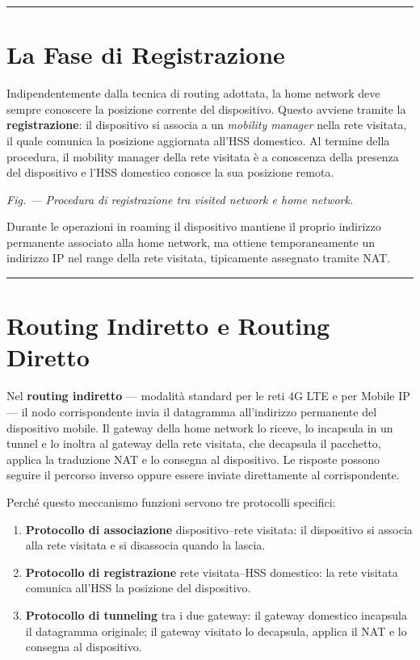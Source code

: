 \documentclass[
  italian,
  openany]{book}
\providecommand{\tightlist}{%
  \setlength{\itemsep}{0pt}\setlength{\parskip}{0pt}}
\begin{document}
\begin{center}\rule{0.5\linewidth}{0.5pt}\end{center}

\section{La Fase di Registrazione}\label{la-fase-di-registrazione}

Indipendentemente dalla tecnica di routing adottata, la home network
deve sempre conoscere la posizione corrente del dispositivo. Questo
avviene tramite la \textbf{registrazione}: il dispositivo si associa a
un \emph{mobility manager} nella rete visitata, il quale comunica la
posizione aggiornata all'HSS domestico. Al termine della procedura, il
mobility manager della rete visitata è a conoscenza della presenza del
dispositivo e l'HSS domestico conosce la sua posizione remota.

\emph{Fig. --- Procedura di registrazione tra visited network e home
network.}

Durante le operazioni in roaming il dispositivo mantiene il proprio
indirizzo permanente associato alla home network, ma ottiene
temporaneamente un indirizzo IP nel range della rete visitata,
tipicamente assegnato tramite NAT.

\begin{center}\rule{0.5\linewidth}{0.5pt}\end{center}

\section{Routing Indiretto e Routing
Diretto}\label{routing-indiretto-e-routing-diretto}

Nel \textbf{routing indiretto} --- modalità standard per le reti 4G LTE
e per Mobile IP --- il nodo corrispondente invia il datagramma
all'indirizzo permanente del dispositivo mobile. Il gateway della home
network lo riceve, lo incapsula in un tunnel e lo inoltra al gateway
della rete visitata, che decapsula il pacchetto, applica la traduzione
NAT e lo consegna al dispositivo. Le risposte possono seguire il
percorso inverso oppure essere inviate direttamente al corrispondente.

Perché questo meccanismo funzioni servono tre protocolli specifici:

\begin{enumerate}
\def\labelenumi{\arabic{enumi}.}
\tightlist
\item
  \textbf{Protocollo di associazione} dispositivo--rete visitata: il
  dispositivo si associa alla rete visitata e si disassocia quando la
  lascia.
\item
  \textbf{Protocollo di registrazione} rete visitata--HSS domestico: la
  rete visitata comunica all'HSS la posizione del dispositivo.
\item
  \textbf{Protocollo di tunneling} tra i due gateway: il gateway
  domestico incapsula il datagramma originale; il gateway visitato lo
  decapsula, applica il NAT e lo consegna al dispositivo.
\end{enumerate}
\end{document}
